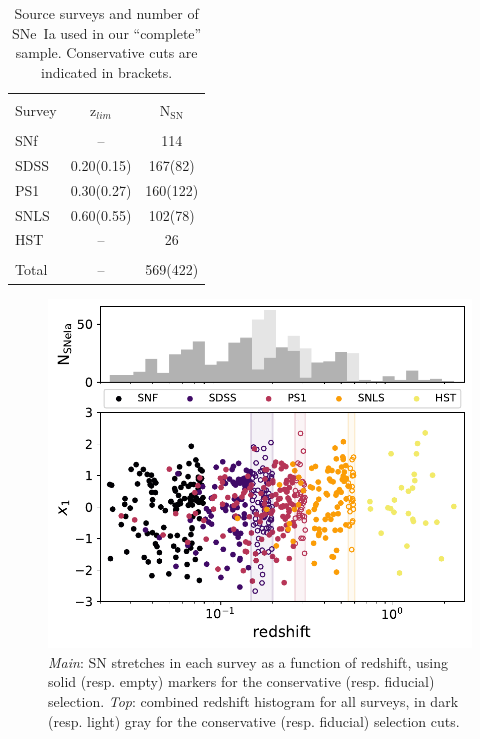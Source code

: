 \documentclass[]{aa} %
\newcommand{\nn}[1]{{\textcolor[rgb]{1, 0.27, 0}{#1}}}
\begin{document}
\begin{table}
    \centering
    \caption{\nn{Source surveys and number of SNe~Ia used in our ``complete''
    sample. Conservative cuts are indicated in brackets.}}
    \label{tab:sample}
    \begin{tabular}{l c c}
    \hline\hline\\[-0.8em]
        Survey & z$_{lim}$ & N$_{\mathrm{SN}}$ \\[0.15em]
        \hline\\[-0.8em]
        SNf & -- & 114\\[0.30em]
        SDSS & 0.20(0.15) & 167(82)\\[0.30em]
        PS1 & 0.30(0.27) & 160(122)\\[0.30em]        
        SNLS & 0.60(0.55) & 102(78)\\[0.30em]
        HST & -- & 26\\[0.30em]
        \hline\\[-0.8em]
        Total & -- & 569(422)\\[0.30em]
        \hline
    \end{tabular}
\end{table}

\begin{figure}
    \centering
    \includegraphics[width=0.95\linewidth]{Article_figures/stretchs-cut_btw_hist_cumu_75-lb-inferno.pdf}
    \caption{\nn{\textit{Main}: SN stretches in each survey as a function of redshift, using solid (resp. empty) markers for the
    conservative (resp. fiducial) selection. \textit{Top}: combined redshift 
    histogram for all surveys, in dark (resp. light) gray for the conservative (resp. fiducial) selection cuts.}}
    \label{fig:sample}
\end{figure}
\end{document}
